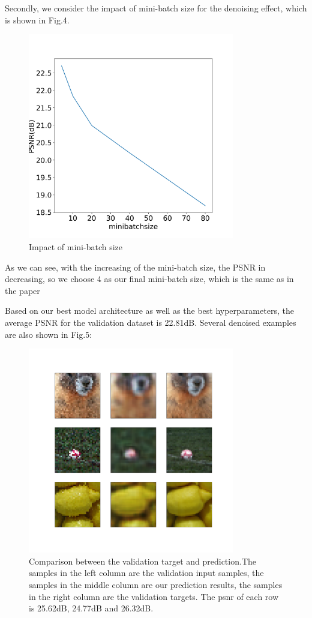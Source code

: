 Secondly, we consider the impact of mini-batch size for the denoising effect, which is shown in Fig.4.
\begin{figure}[h]
    \begin{center}
        \includegraphics[width=9cm]{contents/minibatch.png}
        \caption{Impact of mini-batch size}
        \label{Impact of mini-batch size}
    \end{center}
\end{figure}
As we can see, with the increasing of the mini-batch size, the PSNR in decreasing, so we choose 4 as our final mini-batch size, which is the same as in the paper\cite{n2n}

Based on our best model architecture as well as the best hyperparameters, the average PSNR for the validation dataset is 22.81dB. Several denoised examples are also shown in Fig.5: 
\begin{figure}[h]
    \begin{center}
        \includegraphics[width=9cm]{contents/comparison.png}
        \caption{Comparison between the validation target and prediction.The samples in the left column are the validation input samples, the samples in the middle column are our prediction results, the samples in the right column are the validation targets. The psnr of each row is 25.62dB, 24.77dB and 26.32dB.}
        \label{Comparison between the validation target and prediction}
    \end{center}
\end{figure}

